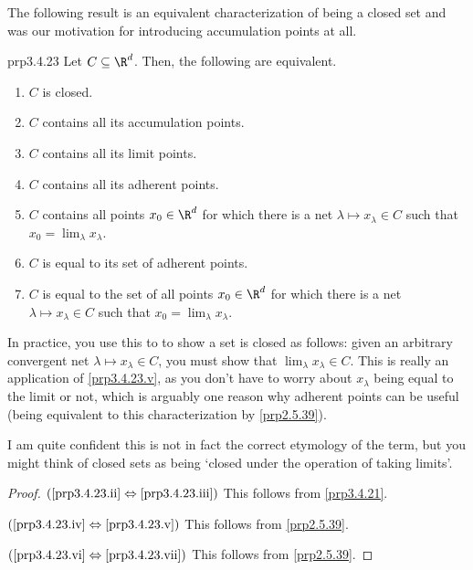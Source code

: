 The following result is an equivalent characterization of being a closed set and was our motivation for introducing accumulation points at all.
\begin{thm}{}{prp3.4.23}
Let $C\subseteq \R ^d$.  Then, the following are equivalent.
\begin{enumerate}
\item \label{prp3.4.23.i}$C$ is closed.
\item \label{prp3.4.23.ii}$C$ contains all its accumulation points.
\item \label{prp3.4.23.iii}$C$ contains all its limit points.
\item \label{prp3.4.23.iv}$C$ contains all its adherent points.
\item \label{prp3.4.23.v}$C$ contains all points $x_0\in \R ^d$ for which there is a net $\lambda \mapsto x_{\lambda}\in C$ such that $x_0=\lim _{\lambda}x_{\lambda}$.
\item \label{prp3.4.23.vi}$C$ is equal to its set of adherent points.
\item \label{prp3.4.23.vii}$C$ is equal to the set of all points $x_0\in \R ^d$ for which there is a net $\lambda \mapsto x_{\lambda}\in C$ such that $x_0=\lim _{\lambda}x_{\lambda}$.
\end{enumerate}
\begin{rmk}
In practice, you use this to to show a set is closed as follows:  given an arbitrary convergent net $\lambda \mapsto x_{\lambda}\in C$, you must show that $\lim _{\lambda}x_{\lambda}\in C$.  This is really an application of \cref{prp3.4.23.v}, as you don't have to worry about $x_{\lambda}$ being equal to the limit or not, which is arguably one reason why adherent points can be useful (being equivalent to this characterization by \cref{prp2.5.39}).
\end{rmk}
\begin{rmk}
I am quite confident this is not in fact the correct etymology of the term, but you might think of closed sets as being `closed under the operation of taking limits'.
\end{rmk}
\begin{proof}
$(\cref{prp3.4.23.ii}\Leftrightarrow \cref{prp3.4.23.iii})$ This follows from \cref{prp3.4.21}.

\blankline
\noindent
$(\cref{prp3.4.23.iv}\Leftrightarrow \cref{prp3.4.23.v})$ This follows from \cref{prp2.5.39}.

\blankline
\noindent
$(\cref{prp3.4.23.vi}\Leftrightarrow \cref{prp3.4.23.vii})$ This follows from \cref{prp2.5.39}.


\end{proof}
\end{thm}
